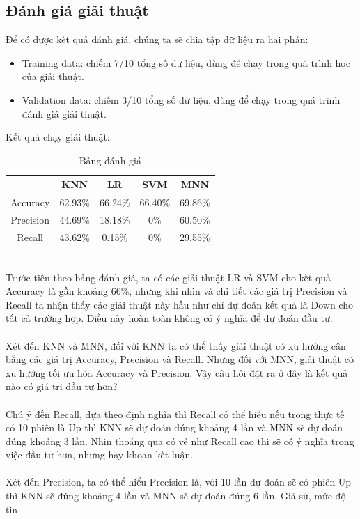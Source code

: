 \subsection{Đánh giá giải thuật}
Để có được kết quả đánh giá, chúng ta sẽ chia tập dữ liệu ra hai phần:
\begin{itemize}
\item Training data: chiếm 7/10 tổng số dữ liệu, dùng để chạy trong quá trình 
học của giải thuật.
\item Validation data: chiếm 3/10 tổng số dữ liệu, dùng để chạy trong quá trình 
đánh giá giải thuật.
\end{itemize}
Kết quả chạy giải thuật:\\
\begin{table}[h]
\centering
\begin{tabular}{ |c|c|c|c|c| }
\hline
 & KNN & LR & SVM & MNN \\
\hline
Accuracy & 62.93\% & 66.24\% & 66.40\% & 69.86\% \\
\hline
Precision & 44.69\% & 18.18\% & 0\% & 60.50\% \\
\hline
Recall & 43.62\% & 0.15\% & 0\% & 29.55\% \\
\hline
\end{tabular}
\caption{Bảng đánh giá}
\end{table}\\
Trước tiên theo bảng đánh giá, ta có các giải thuật LR và SVM cho kết quả Accuracy
là gần khoảng 66\%, nhưng khi nhìn và chi tiết các giá trị Precision và Recall 
ta nhận thấy các giải thuật này hầu như chỉ dự đoán kết quả là Down cho tất cả 
trường hợp. Điều này hoàn toàn không có ý nghĩa để dự đoán đầu tư.\\\\
Xét đến KNN và MNN, đối với KNN ta có thể thấy giải thuật có xu hướng cân bằng 
các giá trị Accuracy, Precision và Recall. Nhưng đối với MNN, giải thuật có xu 
hướng tối ưu hóa Accuracy và Precision. Vậy câu hỏi đặt ra ở đây là kết quả nào 
có giá trị đầu tư hơn?\\\\
Chú ý đến Recall, dựa theo định nghĩa thì Recall có thể hiểu nếu trong thực tế 
có 10 phiên là Up thì KNN sẽ dự đoán đúng khoảng 4 lần và MNN sẽ dự đoán đúng 
khoảng 3 lần. Nhìn thoáng qua có vẻ như Recall cao thì sẽ có ý nghĩa trong việc 
đầu tư hơn, nhưng hay khoan kết luận.\\\\
Xét đến Precision, ta có thể hiểu Precision là, với 10 lần dự đoán sẽ có phiên 
Up thì KNN sẽ đúng khoảng 4 lần và MNN sẽ dự đoán đúng 6 lần. Giả sử, mức độ tin 
